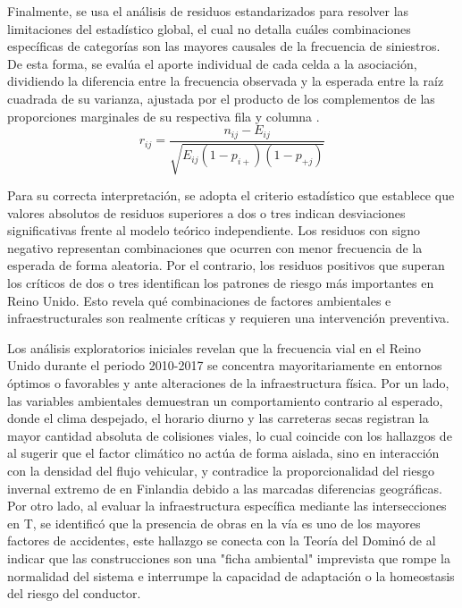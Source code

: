 \documentclass[12pt]{article}
\begin{document}
Finalmente, se usa el análisis de residuos estandarizados para resolver las limitaciones 
del estadístico global, el cual no detalla cuáles combinaciones específicas de categorías 
son las mayores causales de la frecuencia de siniestros. De esta forma, se 
evalúa el aporte individual de cada celda a la asociación, dividiendo la diferencia 
entre la frecuencia observada y la esperada entre la raíz cuadrada de su varianza, 
ajustada por el producto de los complementos de las proporciones marginales de su 
respectiva fila y columna \parencite{Agresti2002}. 
 $$r_{ij} = \frac{n_{ij} - E_{ij}}{\sqrt{E_{ij}(1 - p_{i+})(1 - p_{+j})}}$$

 Para su correcta interpretación, se adopta el criterio estadístico que establece que valores absolutos de residuos superiores a dos o tres indican desviaciones significativas frente al modelo teórico independiente. Los residuos con signo negativo representan combinaciones que ocurren con menor frecuencia de la esperada de forma aleatoria. Por el contrario, los residuos positivos que superan los críticos de dos o tres identifican los patrones de riesgo más importantes en Reino Unido. Esto revela qué combinaciones de factores ambientales e infraestructurales son realmente críticas y requieren una intervención preventiva. 

Los análisis exploratorios iniciales revelan que la frecuencia vial en el Reino Unido durante el periodo 2010-2017 se concentra mayoritariamente en entornos óptimos o favorables y ante alteraciones de la infraestructura física. Por un lado, las variables ambientales demuestran un comportamiento contrario al esperado, donde el clima despejado, el horario diurno y las carreteras secas registran la mayor cantidad absoluta de colisiones viales, lo cual coincide con los hallazgos de \textcite{KARZAN2017} al sugerir que el factor climático no actúa de forma aislada, sino en interacción con la densidad del flujo vehicular, y contradice la proporcionalidad del riesgo invernal extremo de \textcite{MALIN2019} en Finlandia debido a las marcadas diferencias geográficas. Por otro lado, al evaluar la infraestructura específica mediante las intersecciones en T, se identificó que la presencia de obras en la vía es uno de los mayores factores de accidentes, este hallazgo se conecta con la Teoría del Dominó de \textcite{SAXENA2017} al indicar que las construcciones son una "ficha ambiental" imprevista que rompe la normalidad del sistema e interrumpe la capacidad de adaptación o la homeostasis del riesgo del conductor.
\end{document}
